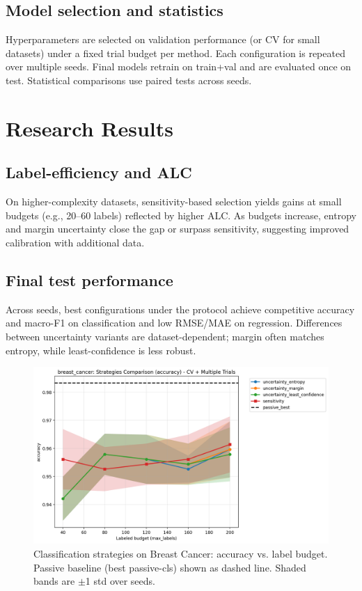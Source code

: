 \documentclass[conference]{IEEEtran}
\begin{document}
\subsection{Model selection and statistics}
Hyperparameters are selected on validation performance (or CV for small datasets) under a fixed trial budget per method. Each configuration is repeated over multiple seeds. Final models retrain on train+val and are evaluated once on test. Statistical comparisons use paired tests across seeds.

\section{Research Results}
\subsection{Label-efficiency and ALC}
On higher-complexity datasets, sensitivity-based selection yields gains at small budgets (e.g., 20–60 labels) reflected by higher ALC. As budgets increase, entropy and margin uncertainty close the gap or surpass sensitivity, suggesting improved calibration with additional data.

\subsection{Final test performance}
Across seeds, best configurations under the protocol achieve competitive accuracy and macro-F1 on classification and low RMSE/MAE on regression. Differences between uncertainty variants are dataset-dependent; margin often matches entropy, while least-confidence is less robust.

\begin{figure}[t]
\centering
\includegraphics[width=0.95\columnwidth]{figures/cls_breast_cancer_comparison_accuracy.png}
\caption{Classification strategies on Breast Cancer: accuracy vs. label budget. Passive baseline (best passive-cls) shown as dashed line. Shaded bands are $\pm$1 std over seeds.}
\label{fig:cls-compare}
\end{figure}
\end{document}

